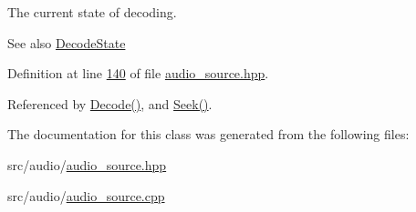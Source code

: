 The current state of decoding. 

\begin{DoxySeeAlso}{See also}
\hyperlink{classAudioSource_a9a2f5de44325c84e69a7af1331aa159d}{Decode\+State} 
\end{DoxySeeAlso}


Definition at line \hyperlink{audio__source_8hpp_source_l00140}{140} of file \hyperlink{audio__source_8hpp_source}{audio\+\_\+source.\+hpp}.



Referenced by \hyperlink{audio__source_8cpp_source_l00133}{Decode()}, and \hyperlink{audio__source_8cpp_source_l00105}{Seek()}.



The documentation for this class was generated from the following files\+:\begin{DoxyCompactItemize}
\item 
src/audio/\hyperlink{audio__source_8hpp}{audio\+\_\+source.\+hpp}\item 
src/audio/\hyperlink{audio__source_8cpp}{audio\+\_\+source.\+cpp}\end{DoxyCompactItemize}

